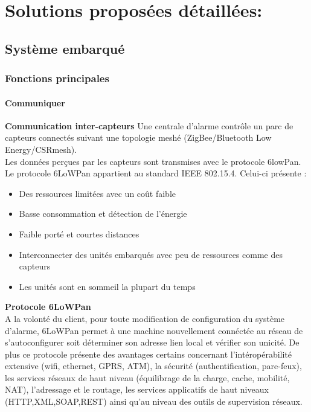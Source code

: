 \chapter{Solutions proposées détaillées:}

\section{Système embarqué}

\subsection{Fonctions principales}

\subsubsection{Communiquer}
\textbf{Communication inter-capteurs}
Une centrale d'alarme contrôle un parc de capteurs connectés suivant une topologie meshé (ZigBee/Bluetooth Low Energy/CSRmesh).\\
Les données perçues par les capteurs sont transmises avec le protocole 6lowPan.\\
Le protocole 6LoWPan appartient au standard IEEE 802.15.4. Celui-ci présente :\\
\begin{itemize}
\item Des ressources limitées avec un coût faible
\item Basse consommation et détection de l'énergie 
\item Faible porté et courtes distances
\item Interconnecter des unités embarqués avec peu de ressources comme des capteurs
\item Les unités sont en sommeil la plupart du temps\\
\end{itemize}

\textbf{Protocole 6LoWPan}\\
A la volonté du client, pour toute modification de configuration du système d'alarme, 6LoWPan permet à une machine nouvellement connéctée au réseau de s'autoconfigurer soit déterminer son adresse lien local et vérifier son unicité. De plus ce protocole présente des avantages certains concernant l'intéropérabilité extensive (wifi, ethernet, GPRS, ATM), la sécurité (authentification, pare-feux), les services réseaux de haut niveau (équilibrage de la charge, cache, mobilité, NAT), l'adressage et le routage, les services applicatifs de haut niveaux (HTTP,XML,SOAP,REST) ainsi qu'au niveau des outils de supervision réseaux.\cite{www:contiki}\\

